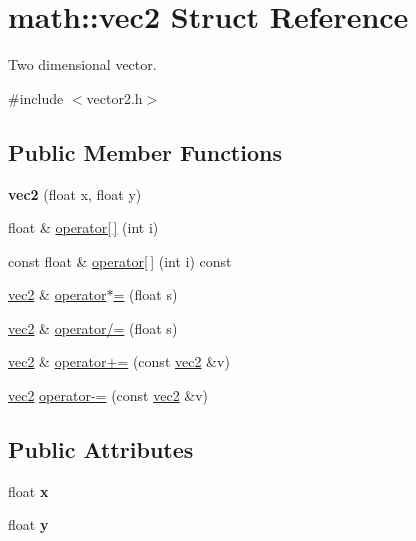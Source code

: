 \hypertarget{structmath_1_1vec2}{}\section{math\+:\+:vec2 Struct Reference}
\label{structmath_1_1vec2}


Two dimensional vector.  




{\ttfamily \#include $<$vector2.\+h$>$}

\subsection*{Public Member Functions}
\begin{DoxyCompactItemize}
\item 
\mbox{\label{structmath_1_1vec2_a7c9641e308af00f8e875de6cd07da88e}} 
{\bfseries vec2} (float x, float y)
\item 
float \& \hyperlink{structmath_1_1vec2_a1ffee39907a0aa106ac5b8a5faa3d7b0}{operator\mbox{[}$\,$\mbox{]}} (int i)
\item 
const float \& \hyperlink{structmath_1_1vec2_a62d6627cb78093fe11107ea52c284583}{operator\mbox{[}$\,$\mbox{]}} (int i) const
\item 
\hyperlink{structmath_1_1vec2}{vec2} \& \hyperlink{structmath_1_1vec2_a29bcd05742fc42c3cce9883693e81b75}{operator$\ast$=} (float s)
\item 
\hyperlink{structmath_1_1vec2}{vec2} \& \hyperlink{structmath_1_1vec2_a5a1153001cba3493edd3a2d8d6060ae2}{operator/=} (float s)
\item 
\hyperlink{structmath_1_1vec2}{vec2} \& \hyperlink{structmath_1_1vec2_af99deb7c62b5c3e494854e6ba83f7422}{operator+=} (const \hyperlink{structmath_1_1vec2}{vec2} \&v)
\item 
\hyperlink{structmath_1_1vec2}{vec2} \hyperlink{structmath_1_1vec2_a9c6705809a9bfa54e6cde070f10a4984}{operator-\/=} (const \hyperlink{structmath_1_1vec2}{vec2} \&v)
\end{DoxyCompactItemize}
\subsection*{Public Attributes}
\begin{DoxyCompactItemize}
\item 
\mbox{\label{structmath_1_1vec2_a80b10d5dce55f531250dc88c9afd2d2b}} 
float {\bfseries x}
\item 
\mbox{\label{structmath_1_1vec2_aec0b4a209674ce9a5fba6f76f514f777}} 
float {\bfseries y}
\end{DoxyCompactItemize}
